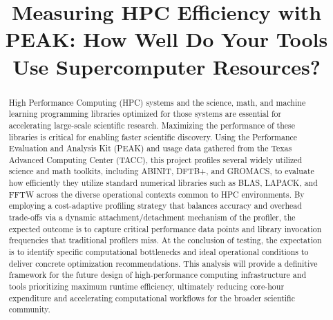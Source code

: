 \documentclass[conference]{IEEEtran}
\begin{document}
\title{Measuring HPC Efficiency with PEAK: How Well Do Your Tools Use Supercomputer Resources?}

\author{
\and
{}
\and
{}
}

\maketitle

\begin{abstract}
High Performance Computing (HPC) systems and the science, math, and machine learning programming libraries optimized for those systems are essential for accelerating large-scale scientific research. Maximizing the performance of these libraries is critical for enabling faster scientific discovery. Using the Performance Evaluation and Analysis Kit (PEAK) and usage data gathered from the Texas Advanced Computing Center (TACC), this project profiles several widely utilized science and math toolkits, including ABINIT, DFTB+, and GROMACS, to evaluate how efficiently they utilize standard numerical libraries such as BLAS, LAPACK, and FFTW across the diverse operational contexts common to HPC environments. By employing a cost-adaptive profiling strategy that balances accuracy and overhead trade-offs via a dynamic attachment/detachment mechanism of the profiler, the expected outcome is to capture critical performance data points and library invocation frequencies that traditional profilers miss. At the conclusion of testing, the expectation is to identify specific computational bottlenecks and ideal operational conditions to deliver concrete optimization recommendations. This analysis will provide a definitive framework for the future design of high-performance computing infrastructure and tools prioritizing maximum runtime efficiency, ultimately reducing core-hour expenditure and accelerating computational workflows for the broader scientific community.
\end{abstract}
\end{document}
